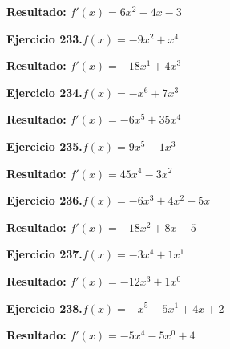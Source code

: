 \documentclass[10pt,a4paper]{article}
\begin{document}
\begin{solbox}
\textbf{Resultado:} \(\displaystyle f'(x) = 6x^{2} -4x -3\)
\end{solbox}

\begin{ejbox}
\textbf{Ejercicio 233.}\quad $f(x) = -9x^{2} + x^{4}$
\end{ejbox}

\begin{solbox}
\textbf{Resultado:} \(\displaystyle f'(x) = -18x^{1} + 4x^{3}\)
\end{solbox}

\begin{ejbox}
\textbf{Ejercicio 234.}\quad $f(x) = -x^{6} + 7x^{3}$
\end{ejbox}

\begin{solbox}
\textbf{Resultado:} \(\displaystyle f'(x) = -6x^{5} + 35x^{4}\)
\end{solbox}

\newpage
\begin{ejbox}
\textbf{Ejercicio 235.}\quad $f(x) = 9x^{5} -1x^{3}$
\end{ejbox}

\begin{solbox}
\textbf{Resultado:} \(\displaystyle f'(x) = 45x^{4} -3x^{2}\)
\end{solbox}

\begin{ejbox}
\textbf{Ejercicio 236.}\quad $f(x) = -6x^3 +4x^2 -5x$
\end{ejbox}

\begin{solbox}
\textbf{Resultado:} \(\displaystyle f'(x) = -18x^2 +8x -5\)
\end{solbox}

\begin{ejbox}
\textbf{Ejercicio 237.}\quad $f(x) = -3x^{4} +1x^{1}$
\end{ejbox}

\begin{solbox}
\textbf{Resultado:} \(\displaystyle f'(x) = -12x^{3} +1x^{0}\)
\end{solbox}

\newpage
\begin{ejbox}
\textbf{Ejercicio 238.}\quad $f(x) = -x^{5} -5x^{1} +4x +2$
\end{ejbox}

\begin{solbox}
\textbf{Resultado:} \(\displaystyle f'(x) = -5x^{4} -5x^{0} +4\)
\end{solbox}
\end{document}
